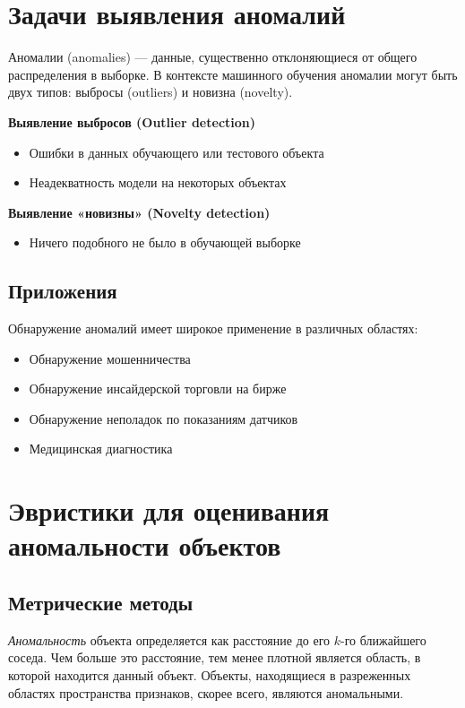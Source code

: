 
\section{Задачи выявления аномалий}

Аномалии (anomalies) --- данные, существенно отклоняющиеся от общего распределения в выборке. В контексте машинного обучения аномалии могут быть двух типов: выбросы (outliers) и новизна (novelty).

\textbf{Выявление выбросов (Outlier detection)}

\begin{itemize}
    \item Ошибки в данных обучающего или тестового объекта
    \item Неадекватность модели на некоторых объектах
\end{itemize}

\textbf{Выявление «новизны» (Novelty detection)}

\begin{itemize}
    \item Ничего подобного не было в обучающей выборке
\end{itemize}


\subsection{Приложения}

Обнаружение аномалий имеет широкое применение в различных областях:

\begin{itemize}
    \item Обнаружение мошенничества
    \item Обнаружение инсайдерской торговли на бирже
    \item Обнаружение неполадок по показаниям датчиков
    \item Медицинская диагностика
\end{itemize}

\section{Эвристики для оценивания аномальности объектов}

\subsection{Метрические методы}

\textit{Аномальность} объекта определяется как расстояние до его $k$-го ближайшего соседа. Чем больше это расстояние, тем менее плотной является область, в которой находится данный объект. Объекты, находящиеся в разреженных областях пространства признаков, скорее всего, являются аномальными.


